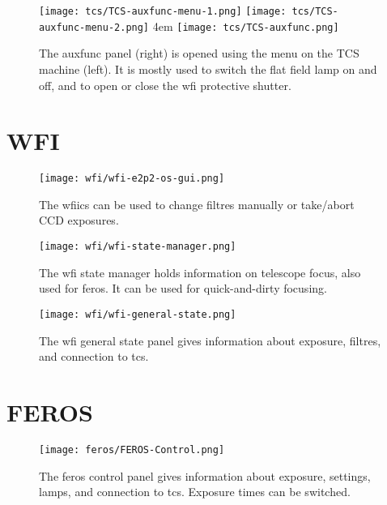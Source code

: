 \documentclass[11pt,fleqn,a4paper]{book}
\begin{document}
\begin{figure}[!ht]
\centering
\texttt{[image: tcs/TCS-auxfunc-menu-1.png]}%
\texttt{[image: tcs/TCS-auxfunc-menu-2.png]}
\hglue 4em
\texttt{[image: tcs/TCS-auxfunc.png]}
\caption[Auxiliary functions of the telescope control software]{The \gls{auxfunc} panel (right) is opened using the menu
on the TCS machine (left). It is mostly used to switch the flat field 
lamp on and off, and to open or close the \gls{wfi} \gls{protective shutter}.}
\label{fig:tcsauxfunc}
\end{figure}

\section{WFI}

\begin{figure}[!ht]
\centering
\texttt{[image: wfi/wfi-e2p2-os-gui.png]}
\caption[WFI ICS Control]{The \gls{wfiics} can be used to change filtres manually or
take/abort CCD exposures.}
\label{fig:wfios}
\end{figure}

\begin{figure}[!ht]
\centering
\texttt{[image: wfi/wfi-state-manager.png]}
\caption[WFI state manager]{The \gls{wfi} \gls{state manager} holds information on telescope \gls{focus}, also used for \gls{feros}. It can be used for quick-and-dirty focusing.}
\label{fig:wfistate}
\end{figure}

\begin{figure}[!ht]
\centering
\texttt{[image: wfi/wfi-general-state.png]}
\caption[WFI \gls{General State} panel]{The \gls{wfi} general state panel gives information
about exposure, filtres, and connection to \gls{tcs}.}
\label{fig:wfigen}
\end{figure}

\section{FEROS}

\begin{figure}[!ht]
\centering
\texttt{[image: feros/FEROS-Control.png]}
\caption[FEROS control panel]{The \gls{feros} control panel gives information
about exposure, settings, lamps, and connection to \gls{tcs}.  Exposure times
can be switched.}
\label{fig:feroscon}
\end{figure}
\end{document}
